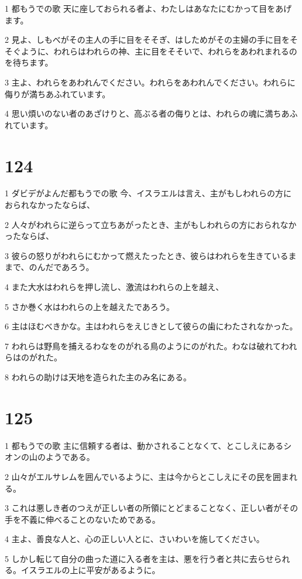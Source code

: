 \par 1 都もうでの歌 天に座しておられる者よ、わたしはあなたにむかって目をあげます。
\par 2 見よ、しもべがその主人の手に目をそそぎ、はしためがその主婦の手に目をそそぐように、われらはわれらの神、主に目をそそいで、われらをあわれまれるのを待ちます。
\par 3 主よ、われらをあわれんでください。われらをあわれんでください。われらに侮りが満ちあふれています。
\par 4 思い煩いのない者のあざけりと、高ぶる者の侮りとは、われらの魂に満ちあふれています。

\chapter{124}

\par 1 ダビデがよんだ都もうでの歌 今、イスラエルは言え、主がもしわれらの方におられなかったならば、
\par 2 人々がわれらに逆らって立ちあがったとき、主がもしわれらの方におられなかったならば、
\par 3 彼らの怒りがわれらにむかって燃えたったとき、彼らはわれらを生きているままで、のんだであろう。
\par 4 また大水はわれらを押し流し、激流はわれらの上を越え、
\par 5 さか巻く水はわれらの上を越えたであろう。
\par 6 主はほむべきかな。主はわれらをえじきとして彼らの歯にわたされなかった。
\par 7 われらは野鳥を捕えるわなをのがれる鳥のようにのがれた。わなは破れてわれらはのがれた。
\par 8 われらの助けは天地を造られた主のみ名にある。

\chapter{125}

\par 1 都もうでの歌 主に信頼する者は、動かされることなくて、とこしえにあるシオンの山のようである。
\par 2 山々がエルサレムを囲んでいるように、主は今からとこしえにその民を囲まれる。
\par 3 これは悪しき者のつえが正しい者の所領にとどまることなく、正しい者がその手を不義に伸べることのないためである。
\par 4 主よ、善良な人と、心の正しい人とに、さいわいを施してください。
\par 5 しかし転じて自分の曲った道に入る者を主は、悪を行う者と共に去らせられる。イスラエルの上に平安があるように。

